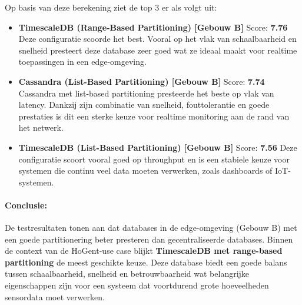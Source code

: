 Op basis van deze berekening ziet de top 3 er als volgt uit:

\begin{itemize}
    \item \textbf{TimescaleDB (Range-Based Partitioning) [Gebouw B]} Score: \textbf{7.76}  
    Deze configuratie scoorde het best. Vooral op het vlak van schaalbaarheid en snelheid presteert deze database zeer goed wat ze ideaal maakt voor realtime toepassingen in een edge-omgeving.

    \item \textbf{Cassandra (List-Based Partitioning) [Gebouw B]} Score: \textbf{7.74}  
    Cassandra met list-based partitioning presteerde het beste op vlak van latency. Dankzij zijn combinatie van snelheid, fouttolerantie en goede prestaties is dit een sterke keuze voor realtime monitoring aan de rand van het netwerk.

    \item \textbf{TimescaleDB (List-Based Partitioning) [Gebouw B]} Score: \textbf{7.56}  
    Deze configuratie scoort vooral goed op throughput en is een stabiele keuze voor systemen die continu veel data moeten verwerken, zoals dashboards of IoT-systemen.
\end{itemize}

\paragraph{Conclusie:}
De testresultaten tonen aan dat databases in de edge-omgeving (Gebouw B) met een goede partitionering beter presteren dan gecentraliseerde databases.  
Binnen de context van de HoGent-use case blijkt \textbf{TimescaleDB met range-based partitioning} de meest geschikte keuze. Deze database biedt een goede balans tussen schaalbaarheid, snelheid en betrouwbaarheid wat belangrijke eigenschappen zijn voor een systeem dat voortdurend grote hoeveelheden sensordata moet verwerken.